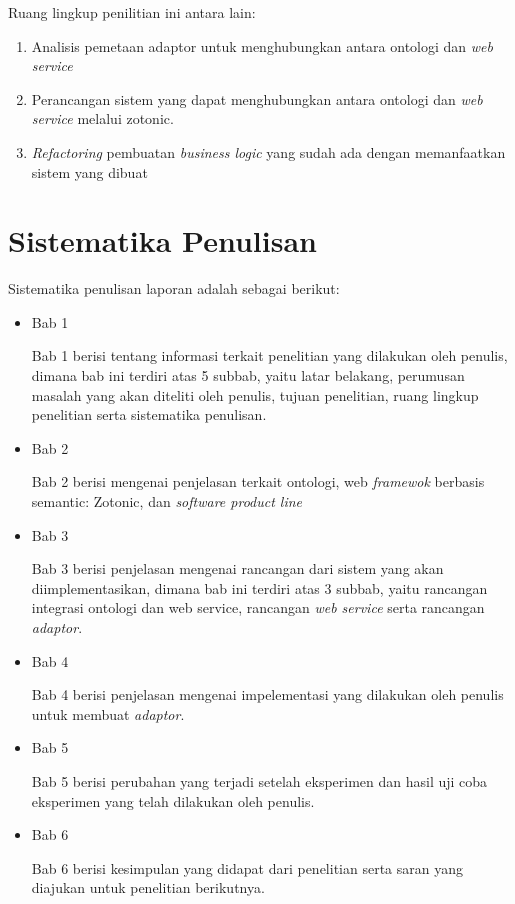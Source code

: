 Ruang lingkup penilitian ini antara lain:
\begin{enumerate}
\item Analisis pemetaan adaptor untuk menghubungkan antara ontologi dan \textit{web service}
\item Perancangan sistem yang dapat menghubungkan antara ontologi dan \textit{web service} melalui zotonic.
\item \textit{Refactoring} pembuatan \textit{business logic} yang sudah ada dengan memanfaatkan sistem yang dibuat
\end{enumerate}

\section{Sistematika Penulisan}
Sistematika penulisan laporan adalah sebagai berikut:
\begin{itemize}
	\item Bab 1 \babSatu
	
	Bab 1 berisi tentang informasi terkait penelitian yang dilakukan oleh penulis, dimana bab ini terdiri atas 5 subbab, yaitu latar belakang, perumusan masalah yang akan diteliti oleh penulis, tujuan penelitian, ruang lingkup penelitian serta sistematika penulisan.\\
	\item Bab 2 \babDua
	
	Bab 2 berisi mengenai penjelasan terkait ontologi, web \textit{framewok} berbasis semantic: Zotonic, dan \textit{software product line}\\
	\item Bab 3 \babTiga 
	
	Bab 3 berisi penjelasan mengenai rancangan dari sistem yang akan diimplementasikan, dimana bab ini terdiri atas 3 subbab, yaitu rancangan integrasi ontologi dan web service, rancangan \textit{web service} serta rancangan \textit{adaptor}.\\
	
	\item Bab 4 \babEmpat
	
	Bab 4 berisi penjelasan mengenai impelementasi yang dilakukan oleh penulis untuk membuat \textit{adaptor}. \\
	
	\item Bab 5 \babLima	
	
	Bab 5 berisi perubahan yang terjadi setelah eksperimen dan hasil uji coba eksperimen yang telah dilakukan oleh penulis. \\
	
	\item Bab 6 \babEnam
	
	Bab 6 berisi kesimpulan yang didapat dari penelitian serta saran yang diajukan untuk penelitian berikutnya.
\end{itemize}